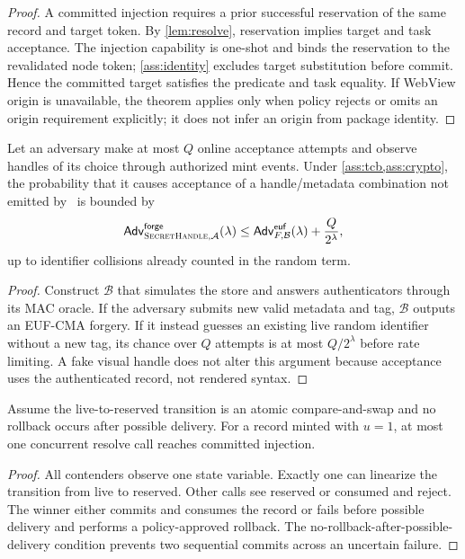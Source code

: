 \begin{proof}
A committed injection requires a prior successful reservation of the same record and target token. By \cref{lem:resolve}, reservation implies target and task acceptance. The injection capability is one-shot and binds the reservation to the revalidated node token; \cref{ass:identity} excludes target substitution before commit. Hence the committed target satisfies the predicate and task equality. If WebView origin is unavailable, the theorem applies only when policy rejects or omits an origin requirement explicitly; it does not infer an origin from package identity.
\end{proof}

\begin{theorem}
\label{thm:unforgeability}
Let an adversary make at most $Q$ online acceptance attempts and observe handles of its choice through authorized mint events. Under \cref{ass:tcb,ass:crypto}, the probability that it causes acceptance of a handle/metadata combination not emitted by \Mint\ is bounded by
\begin{equation}
\mathsf{Adv}^{\mathsf{forge}}_{\textsc{SecretHandle},\mathcal{A}}(\lambda)
\leq \mathsf{Adv}^{\mathsf{euf}}_{F,\mathcal{B}}(\lambda)+\frac{Q}{2^\lambda},
\label{eq:forge}
\end{equation}
up to identifier collisions already counted in the random term.
\end{theorem}

\begin{proof}
Construct $\mathcal{B}$ that simulates the store and answers authenticators through its MAC oracle. If the adversary submits new valid metadata and tag, $\mathcal{B}$ outputs an EUF-CMA forgery. If it instead guesses an existing live random identifier without a new tag, its chance over $Q$ attempts is at most $Q/2^\lambda$ before rate limiting. A fake visual handle does not alter this argument because acceptance uses the authenticated record, not rendered syntax.
\end{proof}

\begin{proposition}
\label{prop:singleuse}
Assume the live-to-reserved transition is an atomic compare-and-swap and no rollback occurs after possible delivery. For a record minted with $u=1$, at most one concurrent resolve call reaches committed injection.
\end{proposition}

\begin{proof}
All contenders observe one state variable. Exactly one can linearize the transition from live to reserved. Other calls see reserved or consumed and reject. The winner either commits and consumes the record or fails before possible delivery and performs a policy-approved rollback. The no-rollback-after-possible-delivery condition prevents two sequential commits across an uncertain failure.
\end{proof}


